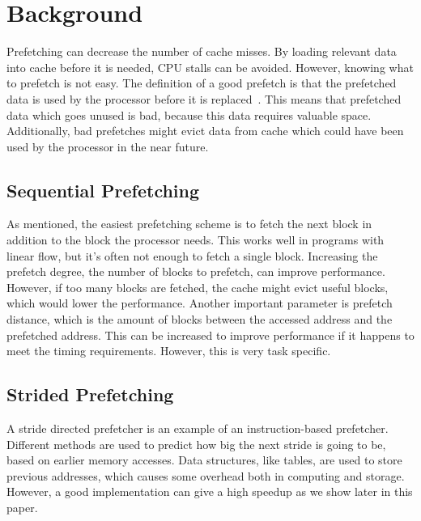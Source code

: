 \section{Background} %



Prefetching can decrease the number of cache misses. By loading
relevant data into cache before it is needed, CPU stalls can be
avoided. However, knowing what to prefetch is not easy. The definition
of a good prefetch is that the prefetched data is used by the
processor before it is
replaced~\cite{srinivasan_davidson_tyson_2004}. This means that
prefetched data which goes unused is bad, because this data requires
valuable space. Additionally, bad prefetches might evict data from
cache which could have been used by the processor in the near future.

\subsection{Sequential Prefetching}

As mentioned, the easiest prefetching scheme is to fetch the next
block in addition to the block the processor needs. This works well in
programs with linear flow, but it's often not enough to fetch a single
block. Increasing the prefetch degree, the number of blocks to
prefetch, can improve performance. However, if too many blocks are
fetched, the cache might evict useful blocks, which would lower the
performance. Another important parameter is prefetch distance, which
is the amount of blocks between the accessed address and the
prefetched address. This can be increased to improve performance if it
happens to meet the timing requirements. However, this is very task
specific.

\subsection{Strided Prefetching}

A stride directed prefetcher is an example of an instruction-based
prefetcher. Different methods are used to predict how big the next
stride is going to be, based on earlier memory accesses. Data
structures, like tables, are used to store previous addresses, which
causes some overhead both in computing and storage. However, a good
implementation can give a high speedup as we show later in this paper.

